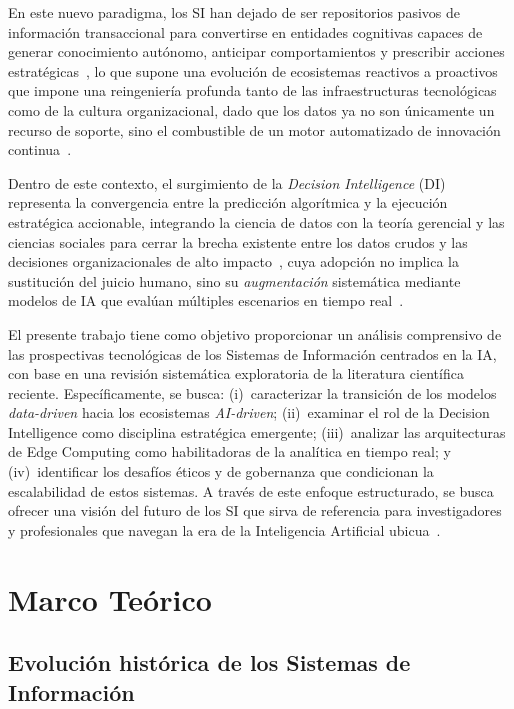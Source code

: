 \documentclass[conference]{IEEEtran}
\begin{document}
En este nuevo paradigma, los SI han dejado de ser repositorios pasivos de información transaccional para convertirse en entidades cognitivas capaces de generar conocimiento autónomo, anticipar comportamientos y prescribir acciones estratégicas~\cite{natta2025,seth2025}, lo que supone una evolución de ecosistemas reactivos a proactivos que impone una reingeniería profunda tanto de las infraestructuras tecnológicas como de la cultura organizacional, dado que los datos ya no son únicamente un recurso de soporte, sino el combustible de un motor automatizado de innovación continua~\cite{murire2024}.
 
Dentro de este contexto, el surgimiento de la \textit{Decision Intelligence} (DI) representa la convergencia entre la predicción algorítmica y la ejecución estratégica accionable, integrando la ciencia de datos con la teoría gerencial y las ciencias sociales para cerrar la brecha existente entre los datos crudos y las decisiones organizacionales de alto impacto~\cite{heilig2024,jeyanthi2022}, cuya adopción no implica la sustitución del juicio humano, sino su \textit{augmentación} sistemática mediante modelos de IA que evalúan múltiples escenarios en tiempo real~\cite{tasleem2024}.
 
El presente trabajo tiene como objetivo proporcionar un análisis
comprensivo de las prospectivas tecnológicas de los Sistemas de
Información centrados en la IA, con base en una revisión sistemática
exploratoria de la literatura científica reciente. Específicamente, se
busca: (i)~caracterizar la transición de los modelos
\textit{data-driven} hacia los ecosistemas \textit{AI-driven}; (ii)~examinar
el rol de la Decision Intelligence como disciplina estratégica emergente;
(iii)~analizar las arquitecturas de Edge Computing como habilitadoras de
la analítica en tiempo real; y (iv)~identificar los desafíos éticos y de
gobernanza que condicionan la escalabilidad de estos sistemas. A través
de este enfoque estructurado, se busca ofrecer una visión del futuro de
los SI que sirva de referencia para investigadores y profesionales que
navegan la era de la Inteligencia Artificial
ubicua~\cite{natta2025,seth2025,tasleem2024}.

\section{Marco Teórico}
 
\subsection{Evolución histórica de los Sistemas de Información}
 
\end{document}
